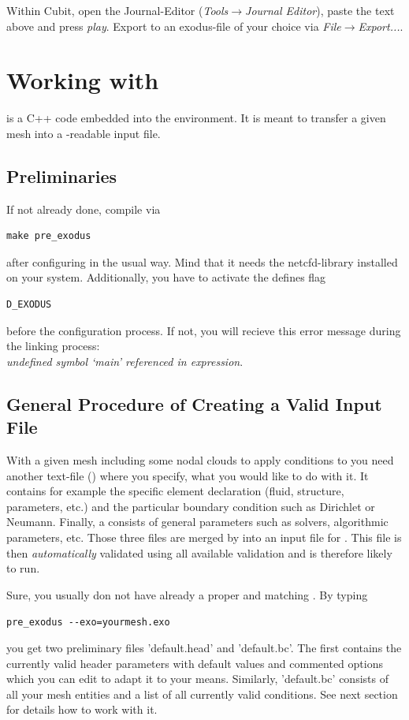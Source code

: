 Within Cubit, open the Journal-Editor (\emph{Tools}$\to$\emph{Journal
Editor}), paste the text above and press \emph{play}. Export to an
exodus-file of your choice via \emph{File}$\to$\emph{Export...}.

\section{Working with \prexo}

\prexo is a C++ code embedded into the \baci{} environment. It is meant to
transfer a given mesh into a \baci{}-readable input file.

\subsection{Preliminaries}

If not already done, compile \prexo via \begin{verbatim}make pre_exodus\end{verbatim} after 
configuring \baci{} in the usual way. Mind that it needs the netcfd-library 
installed on your system. Additionally, you have to activate the defines flag
\begin{verbatim}D_EXODUS\end{verbatim}
before the configuration process. If not, you will recieve this error
message during the linking process:\\
\emph{undefined symbol `main' referenced in expression}. 

\subsection{General Procedure of Creating a Valid \baci{} Input File}
With a given mesh including some nodal clouds to apply conditions to you need
another text-file (\bc) where you specify, what you would like to do with
it. It contains for example the specific element declaration (fluid, structure,
parameters, etc.) and the particular boundary condition such as Dirichlet or
Neumann. Finally, a \head consists of general parameters such as
solvers, algorithmic parameters, etc. Those three files are merged by \prexo
into an input file for \baci{}. This file is then \emph{automatically} validated
using all available \baci{} validation and is therefore likely to run.

Sure, you usually don not have already a proper \head and matching \bc. By
typing
\begin{center}
  \verb|pre_exodus --exo=yourmesh.exo|
\end{center}
you get two preliminary files
'default.head' and 'default.bc'. The first contains the currently valid header
parameters with default values and commented options which you can edit to
adapt it to your means. Similarly, 'default.bc' consists of all your mesh
entities and a list of all currently valid conditions. See next section for
details how to work with it.

